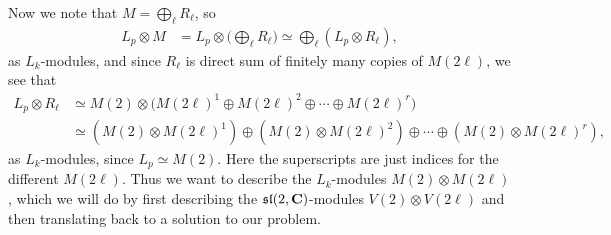 Now we note that $M=\bigoplus_{\ell} R_\ell$, so 
\begin{align*}
  L_p\otimes M &= L_p\otimes \bigl( \bigoplus_{\ell} R_\ell \bigr) \simeq \bigoplus_{\ell} (L_p\otimes R_\ell),
\end{align*}
as $L_k$-modules, and since $R_\ell$ is direct sum of finitely many copies of $M(2\ell)$, we see that
\begin{align*}
  L_p\otimes R_\ell &\simeq M(2)\otimes \bigl( M(2\ell)^1 \oplus M(2\ell)^2 \oplus \dotsb \oplus M(2\ell)^r \bigr) \\
  &\simeq (M(2)\otimes M(2\ell)^1) \oplus (M(2)\otimes M(2\ell)^2) \oplus \dotsb \oplus (M(2)\otimes M(2\ell)^r),
\end{align*}
as $L_k$-modules, since $L_p\simeq M(2)$. Here the superscripts are just indices for the different $M(2\ell)$. Thus we want to describe the $L_k$-modules $M(2)\otimes M(2\ell)$, which we will do by first describing the $\mathfrak{sl}(2,\mathbf{C})$-modules $V(2)\otimes V(2\ell)$ and then translating back to a solution to our problem.

